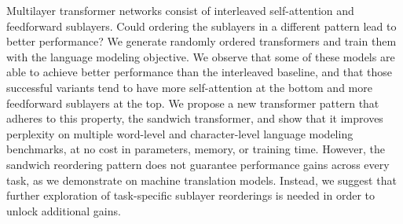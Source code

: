 Multilayer transformer networks consist of interleaved self-attention and feedforward sublayers. Could ordering the sublayers in a different pattern lead to better performance? We generate randomly ordered transformers and train them with the language modeling objective. We observe that some of these models are able to achieve better performance than the interleaved baseline, and that those successful variants tend to have more self-attention at the bottom and more feedforward sublayers at the top. We propose a new transformer pattern that adheres to this property, the sandwich transformer, and show that it improves perplexity on multiple word-level and character-level language modeling benchmarks, at no cost in parameters, memory, or training time. However, the sandwich reordering pattern does not guarantee performance gains across every task, as we demonstrate on machine translation models. Instead, we suggest that further exploration of task-specific sublayer reorderings is needed in order to unlock additional gains.
